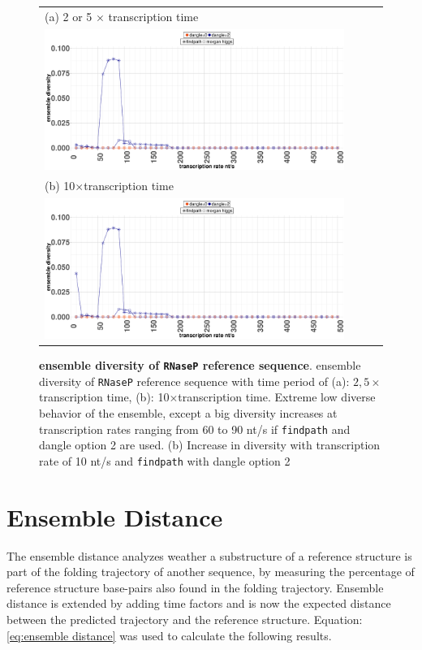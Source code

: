 \documentclass[ twoside,openright,titlepage,numbers=noenddot,headinclude,%
                footinclude=false, cleardoublepage=empty,abstractoff, %
                BCOR=5mm,paper=a4,fontsize=11pt,%
                ngerman,american,%
                ]{scrreprt}
\begin{document}
\begin{figure}[ht]
\begin{tabular}{l}
 (a) 2 or 5 $\times$ transcription time \\
\includegraphics[width=0.9\textwidth]{./pictures/ensembleDiversity/RNaseP25.pdf}\\
\hline
(b) 10$\times$transcription time \\
\includegraphics[width=0.9\textwidth]{./pictures/ensembleDiversity/RNaseP10.pdf}\\
\end{tabular}
\caption{{\bf ensemble diversity of \texttt{RNaseP} reference sequence}.
ensemble diversity of \texttt{RNaseP} reference sequence with time period of (a): $2,5\times$transcription time, (b): 10$\times$transcription time.
Extreme low diverse behavior of the ensemble, except a big diversity increases at transcription rates ranging from 60 to 90 nt/s if \texttt{findpath} and dangle option 2 are used. 
(b) Increase in diversity with transcription rate of 10 nt/s and \texttt{findpath} with dangle option 2 
}
\label{fig:ensemble_diversity_CP001509.3}
\end{figure}
	
\FloatBarrier	
\section{Ensemble Distance}
The ensemble distance analyzes weather a substructure of a reference structure is part of the folding trajectory of another sequence, by measuring the percentage of reference structure base-pairs also found in the folding trajectory.
Ensemble distance is extended by adding time factors and is now the expected distance between the predicted trajectory and the reference structure\cite{EnsembleDistance}.
Equation: \ref{eq:ensemble distance} was used to calculate the following results.
\end{document}
